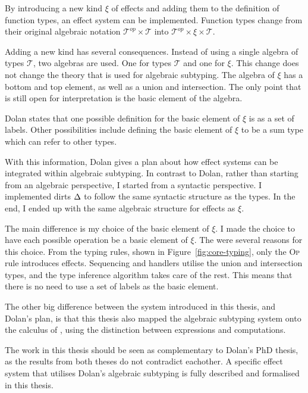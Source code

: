 By introducing a new kind $\xi$ of effects and adding them to the definition of function types, an effect system can be implemented. Function types change from their original algebraic notation $\mathcal{T}^{op} \times \mathcal{T}$ into $\mathcal{T}^{op} \times \xi \times \mathcal{T}$.

Adding a new kind has several consequences. Instead of using a single algebra of types $\mathcal{T}$, two algebras are used. One for types $\mathcal{T}$ and one for $\xi$. This change does not change the theory that is used for algebraic subtyping. The algebra of $\xi$ has a bottom and top element, as well as a union and intersection. The only point that is still open for interpretation is the basic element of the algebra. 

Dolan states that one possible definition for the basic element of $\xi$ is as a set of labels. Other possibilities include defining the basic element of $\xi$ to be a sum type which can refer to other types.

With this information, Dolan gives a plan about how effect systems can be integrated within algebraic subtyping. In contrast to Dolan, rather than starting from an algebraic perspective, I started from a syntactic perspective. I implemented dirts $\Delta$ to follow the same syntactic structure as the types. In the end, I ended up with the same algebraic structure for effects as $\xi$. 

The main difference is my choice of the basic element of $\xi$. I made the choice to have each possible operation be a basic element of $\xi$. The were several reasons for this choice. From the typing rules, shown in Figure~\ref{fig:core-typing}, only the \textsc{Op} rule introduces effects. Sequencing and handlers utilise the union and intersection types, and the type inference algorithm takes care of the rest. This means that there is no need to use a set of labels as the basic element. 

The other big difference between the system introduced in this thesis, \core and Dolan's plan, is that this thesis also mapped the algebraic subtyping system onto the calculus of \eff, using the distinction between expressions and computations.

The work in this thesis should be seen as complementary to Dolan's PhD thesis, as the results from both theses do not contradict eachother. A specific effect system that utilises Dolan's algebraic subtyping is fully described and formalised in this thesis. 

